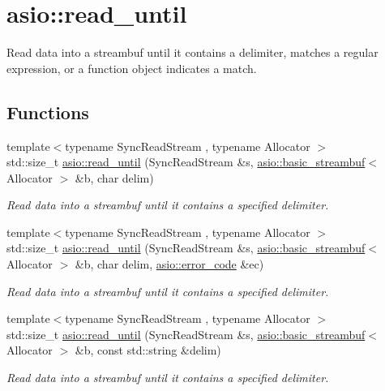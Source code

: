 \hypertarget{group__read__until}{}\section{asio\+:\+:read\+\_\+until}
\label{group__read__until}


Read data into a streambuf until it contains a delimiter, matches a regular expression, or a function object indicates a match.  


\subsection*{Functions}
\begin{DoxyCompactItemize}
\item 
{\footnotesize template$<$typename Sync\+Read\+Stream , typename Allocator $>$ }\\std\+::size\+\_\+t \hyperlink{group__read__until_ga1aae2baa82596a6a9ad320e80b016006}{asio\+::read\+\_\+until} (Sync\+Read\+Stream \&s, \hyperlink{classasio_1_1basic__streambuf}{asio\+::basic\+\_\+streambuf}$<$ Allocator $>$ \&b, char delim)
\begin{DoxyCompactList}\small\item\em Read data into a streambuf until it contains a specified delimiter. \end{DoxyCompactList}\item 
{\footnotesize template$<$typename Sync\+Read\+Stream , typename Allocator $>$ }\\std\+::size\+\_\+t \hyperlink{group__read__until_gab9d265cc5b757caf9c9a602da2d6a3e5}{asio\+::read\+\_\+until} (Sync\+Read\+Stream \&s, \hyperlink{classasio_1_1basic__streambuf}{asio\+::basic\+\_\+streambuf}$<$ Allocator $>$ \&b, char delim, \hyperlink{classasio_1_1error__code}{asio\+::error\+\_\+code} \&ec)
\begin{DoxyCompactList}\small\item\em Read data into a streambuf until it contains a specified delimiter. \end{DoxyCompactList}\item 
{\footnotesize template$<$typename Sync\+Read\+Stream , typename Allocator $>$ }\\std\+::size\+\_\+t \hyperlink{group__read__until_ga6f38642ad22fcb7f72ddc9fd2b586541}{asio\+::read\+\_\+until} (Sync\+Read\+Stream \&s, \hyperlink{classasio_1_1basic__streambuf}{asio\+::basic\+\_\+streambuf}$<$ Allocator $>$ \&b, const std\+::string \&delim)
\begin{DoxyCompactList}\small\item\em Read data into a streambuf until it contains a specified delimiter. \end{DoxyCompactList}\item 

\end{DoxyCompactItemize}
